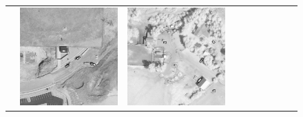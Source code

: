 \begin{figure}[h!]
\begin{tabularx}{\textwidth}{c|*{9}{X}}
    & \includegraphics[trim={440pt 360pt 460pt 555pt},clip,width=\linewidth]{images/015Results/03ablation/comp_images/ground_truth/427.png}
    & \includegraphics[trim={740pt 420pt 180pt 510pt},clip,width=\linewidth]{images/015Results/03ablation/comp_images/ground_truth/523.png}

\end{tabularx}
\end{figure}
